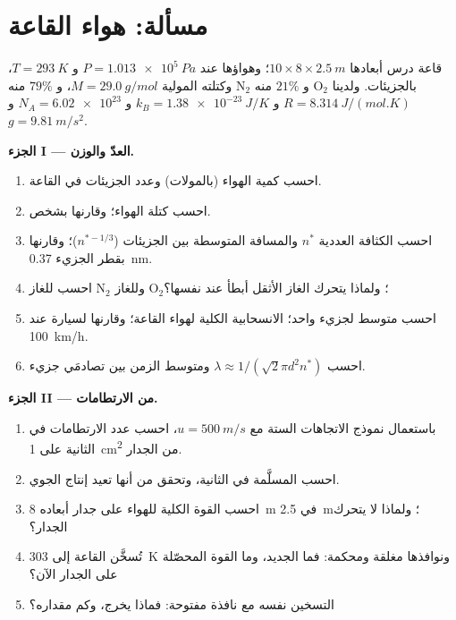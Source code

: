 \section{مسألة: هواء القاعة}

\begin{problem}
\label{pb:b1:kinetic-theory:1}
قاعة درس أبعادها $10 \times 8 \times \qty{2.5}{m}$؛ وهواؤها عند
$P = \qty{1.013e5}{Pa}$ و $T = \qty{293}{K}$، وكتلته المولية $M = \qty{29.0}{g/mol}$،
و $79\%$ منه N$_2$ و $21\%$ منه O$_2$ بالجزيئات. ولدينا $R = \qty{8.314}{J/(mol.K)}$
و $k_B = \qty{1.38e-23}{J/K}$ و $N_A = \num{6.02e23}$ و $g = \qty{9.81}{m/s^2}$.

\medskip
\noindent\textbf{الجزء I --- العدّ والوزن.}
\begin{enumerate}
  \item احسب كمية الهواء (بالمولات) وعدد الجزيئات في القاعة.
  \item احسب كتلة الهواء؛ وقارنها بشخص.
  \item احسب الكثافة العددية $n^*$ والمسافة المتوسطة بين الجزيئات
        ($n^{*-1/3}$)؛ وقارنها بقطر الجزيء \qty{0.37}{nm}.
  \item احسب  للغاز N$_2$ وللغاز O$_2$؛ ولماذا يتحرك الغاز
        الأثقل أبطأ عند  نفسها؟
  \item احسب متوسط  لجزيء واحد؛ 
        الانسحابية الكلية لهواء القاعة؛ وقارنها 
        لسيارة عند \qty{100}{km/h}.
  \item احسب  $\lambda \approx 1/(\sqrt2\pi d^2n^*)$ ومتوسط
        الزمن بين تصادمَي جزيء.
\end{enumerate}

\medskip
\noindent\textbf{الجزء II ---  من الارتطامات.}
\begin{enumerate}[resume]
  \item باستعمال نموذج الاتجاهات الستة مع $u = \qty{500}{m/s}$، احسب
        عدد الارتطامات في الثانية على \qty{1}{cm^2} من الجدار.
  \item احسب  المسلَّمة في الثانية، وتحقق من أنها
        تعيد إنتاج  الجوي.
  \item احسب القوة الكلية للهواء على جدار أبعاده \qty{8}{m} في \qty{2.5}{m}؛
        ولماذا لا يتحرك الجدار؟
  \item تُسخَّن القاعة إلى \qty{303}{K} ونوافذها مغلقة
        ومحكمة: فما  الجديد، وما القوة المحصّلة على الجدار الآن؟
  \item التسخين نفسه مع نافذة مفتوحة: فماذا يخرج، وكم مقداره؟
\end{enumerate}


\end{problem}
